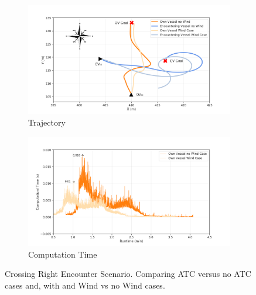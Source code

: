 \begin{figure}[H]
            \begin{subfigure}[b]{0.49\textwidth}
                \centering
                \includegraphics[width=\textwidth]{figs/Chap5/plot_cl_w_vs_wind.png}
                \caption{Trajectory}
                \label{fig:plot_cl_w_vs_wind}
            \end{subfigure}
            \begin{subfigure}[b]{0.49\textwidth}
                \centering
                \includegraphics[width=\textwidth]{figs/Chap5/plot_cl_w_vs_wind_CT.png}
                \caption{Computation Time}
                \label{fig:plot_cl_w_vs_wind_CT}
            \end{subfigure}
        
        \caption{Crossing Right Encounter Scenario. Comparing \ac{ATC} versus no \ac{ATC} cases and, with and Wind vs no Wind cases.}
        \label{fig:plots_cl}
        \end{figure}
        
